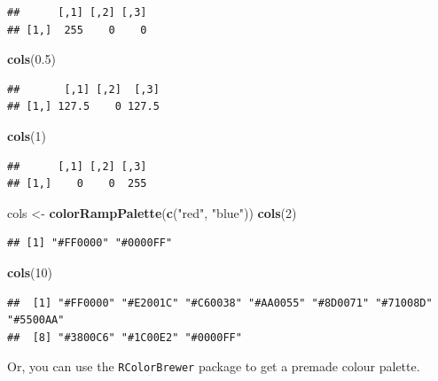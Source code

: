 \documentclass[
]{book}
\newenvironment{Shaded}{\begin{snugshade}}{\end{snugshade}}
\newcommand{\DecValTok}[1]{\textcolor[rgb]{0.00,0.00,0.81}{#1}}
\newcommand{\FloatTok}[1]{\textcolor[rgb]{0.00,0.00,0.81}{#1}}
\newcommand{\KeywordTok}[1]{\textcolor[rgb]{0.13,0.29,0.53}{\textbf{#1}}}
\newcommand{\NormalTok}[1]{#1}
\newcommand{\StringTok}[1]{\textcolor[rgb]{0.31,0.60,0.02}{#1}}
\begin{document}
\begin{verbatim}
##      [,1] [,2] [,3]
## [1,]  255    0    0
\end{verbatim}

\begin{Shaded}
\begin{Highlighting}[]
\KeywordTok{cols}\NormalTok{(}\FloatTok{0.5}\NormalTok{)}
\end{Highlighting}
\end{Shaded}

\begin{verbatim}
##       [,1] [,2]  [,3]
## [1,] 127.5    0 127.5
\end{verbatim}

\begin{Shaded}
\begin{Highlighting}[]
\KeywordTok{cols}\NormalTok{(}\DecValTok{1}\NormalTok{)}
\end{Highlighting}
\end{Shaded}

\begin{verbatim}
##      [,1] [,2] [,3]
## [1,]    0    0  255
\end{verbatim}

\begin{Shaded}
\begin{Highlighting}[]
\NormalTok{cols <-}\StringTok{ }\KeywordTok{colorRampPalette}\NormalTok{(}\KeywordTok{c}\NormalTok{(}\StringTok{"red"}\NormalTok{, }\StringTok{"blue"}\NormalTok{))}
\KeywordTok{cols}\NormalTok{(}\DecValTok{2}\NormalTok{)}
\end{Highlighting}
\end{Shaded}

\begin{verbatim}
## [1] "#FF0000" "#0000FF"
\end{verbatim}

\begin{Shaded}
\begin{Highlighting}[]
\KeywordTok{cols}\NormalTok{(}\DecValTok{10}\NormalTok{)}
\end{Highlighting}
\end{Shaded}

\begin{verbatim}
##  [1] "#FF0000" "#E2001C" "#C60038" "#AA0055" "#8D0071" "#71008D" "#5500AA"
##  [8] "#3800C6" "#1C00E2" "#0000FF"
\end{verbatim}

Or, you can use the \texttt{RColorBrewer} package to get a premade colour palette.
\end{document}
